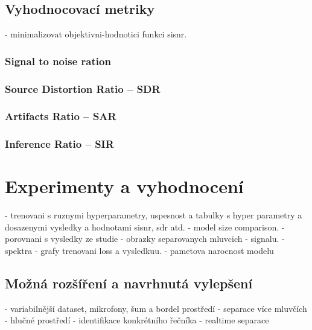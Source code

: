
\section{Vyhodnocovací metriky}
- minimalizovat objektivni-hodnotici funkci sisnr.
\subsection{Signal to noise ration}
\subsection*{Source Distortion Ratio -- SDR}
\subsection*{Artifacts Ratio -- SAR}
\subsection*{Inference Ratio -- SIR}





\chapter{Experimenty a vyhodnocení}
\label{experimenty}
- trenovani s ruznymi hyperparametry, uspesnost a tabulky s hyper parametry a dosazenymi vysledky a hodnotami sisnr, sdr atd.
- model size comparison.
- porovnani s vysledky ze studie
- obrazky separovanych mluvcich - signalu.
- spektra
- grafy trenovani loss a vysledkuu.
- pametova narocnost modelu


\section{Možná rozšíření a navrhnutá vylepšení}
- variabilnější dataset, mikrofony, šum a bordel prostředí
- separace více mluvčích
- hlučné prostředí
- identifikace konkrétního řečníka
- realtime separace



